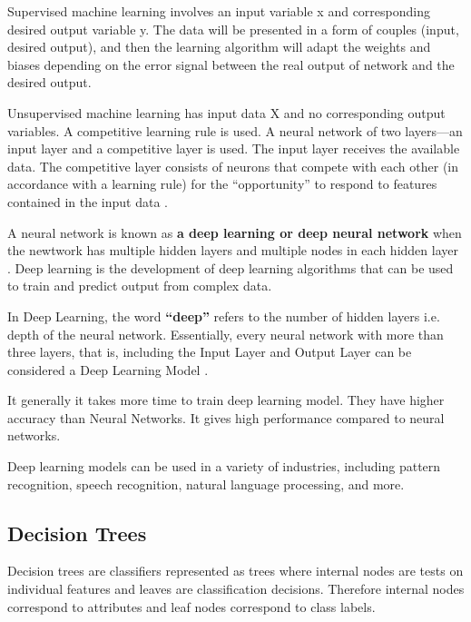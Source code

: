 Supervised machine learning involves an input variable x and corresponding desired output variable y. The data will be presented in a form of couples (input, desired output), and then the learning algorithm will adapt the weights and biases depending on the error signal between the real output of network and the desired output.

Unsupervised machine learning has input data X and no corresponding output variables. A competitive learning rule is used. A neural network of two layers—an input layer and a competitive layer is used. The input layer receives the available data. The competitive layer consists of neurons that compete with each other (in accordance with a learning rule) for the “opportunity” to respond to features contained in the input data \cite{inbook}.

A neural network  is known as \textbf{a deep learning or deep neural network} when the newtwork has multiple hidden layers and multiple nodes in each hidden layer \cite{MOHAMMED_MUSTAPHA_MAMDOUH}. Deep learning is the development of deep learning algorithms that can be used to train and predict output from complex data.


 In Deep Learning, the word \textbf{“deep”} refers to the number of hidden layers i.e. depth of the neural network. Essentially, every neural network with more than three layers, that is, including the Input Layer and Output Layer can be considered a Deep Learning Model \cite{inbook_Singh}.

 It generally it takes more time to train deep learning model. They have higher accuracy than Neural Networks. It gives high performance compared to neural networks.

Deep learning models can be used in a variety of industries, including pattern recognition, speech recognition, natural language processing, and more.


\subsection{Decision Trees} %
\label{sub: Decision_Trees}

Decision trees \cite{J_Ross_Quinlan1994} are classifiers represented as trees where internal nodes are tests on individual features and leaves are classification decisions. Therefore internal nodes correspond to attributes and leaf nodes correspond to class labels.

